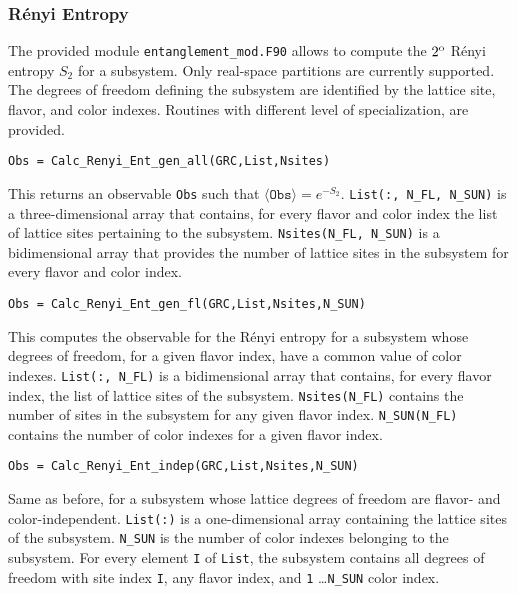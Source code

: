 %
\subsubsection{R{\'e}nyi Entropy}
The provided module \texttt{entanglement\_mod.F90} allows to compute the $2^{\rm o}$ R\'enyi entropy $S_2$ for a subsystem. Only real-space partitions are currently supported.
The degrees of freedom defining the subsystem are identified by the lattice site, flavor, and color indexes.
Routines with different level of specialization, are provided.

\begin{lstlisting}[style=fortran]
Obs = Calc_Renyi_Ent_gen_all(GRC,List,Nsites)
\end{lstlisting}

This returns an observable \texttt{Obs} such that $\langle\texttt{Obs}\rangle=e^{-S_2}$. \texttt{List(:, N\_FL, N\_SUN)} is a three-dimensional array that contains, for every flavor and color index the list of lattice sites pertaining to the subsystem. \texttt{Nsites(N\_FL, N\_SUN)} is a bidimensional array that provides the number of lattice sites in the subsystem for every flavor and color index.

\begin{lstlisting}[style=fortran]
Obs = Calc_Renyi_Ent_gen_fl(GRC,List,Nsites,N_SUN)
\end{lstlisting}
This computes the observable for the R\'enyi entropy for a subsystem whose degrees of freedom, for a given flavor index, have a common value of color indexes. \texttt{List(:, N\_FL)} is a bidimensional array that contains, for every flavor index, the list of lattice sites of the subsystem. \texttt{Nsites(N\_FL)} contains the number of sites in the subsystem for any given flavor index. \texttt{N\_SUN(N\_FL)} contains the number of color indexes for a given flavor index.

\begin{lstlisting}[style=fortran]
Obs = Calc_Renyi_Ent_indep(GRC,List,Nsites,N_SUN)
\end{lstlisting}
Same as before, for a subsystem whose lattice degrees of freedom are flavor- and color-independent. \texttt{List(:)} is a one-dimensional array containing the lattice sites of the subsystem.
\texttt{N\_SUN} is the number of color indexes belonging to the subsystem.
For every element \texttt{I} of \texttt{List}, the subsystem contains all degrees of freedom with site index \texttt{I}, any flavor index, and \texttt{1} \ldots \texttt{N\_SUN} color index.

